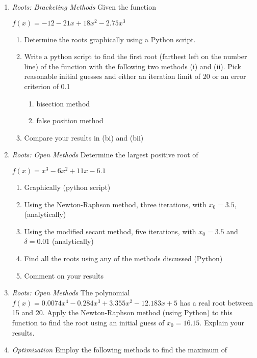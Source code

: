 \documentclass[11pt]{article}
\begin{document}
\begin{enumerate}
    \item \textit{Roots: Bracketing Methods} Given the function
    \begin{center}
        $f(x)=-12-21x+18x^2-2.75x^3$
    \end{center}
        \begin{enumerate}
            \item Determine the roots graphically using a Python script.
            \item Write a python script to find the first root (farthest left on the number line) of the function with the following two methods (i) and (ii). Pick reasonable initial guesses and either an iteration limit of 20 or an error criterion of 0.1%
            \begin{enumerate}
                \item bisection method
                \item false position method
            \end{enumerate}
        \item Compare your results in (bi) and (bii)
        \end{enumerate}
    \item \textit{Roots: Open Methods} Determine the largest positive root of
        \begin{center}
        $f(x)=x^3-6x^2+11x-6.1$
        \end{center}
        \begin{enumerate}
            \item Graphically (python script)
            \item Using the Newton-Raphson method, three iterations, with $x_0=3.5,$ (analytically)
            \item Using the modified secant method, five iterations, with $x_0=3.5$ and $\delta=0.01$ (analytically)
            \item Find all the roots using any of the methods discussed (Python)
            \item Comment on your results
        \end{enumerate}
	\item \textit{Roots: Open Methods} The polynomial $f(x)=0.0074x^4-0.284x^3+3.355x^2-12.183x+5$ has a real root between 15 and 20. Apply the Newton-Raphson method (using Python) to this function to find the root using an initial guess of $x_0=16.15$. Explain your results.
	\item \textit{Optimization} Employ the following methods to find the maximum of  

\end{enumerate}
\end{document}
